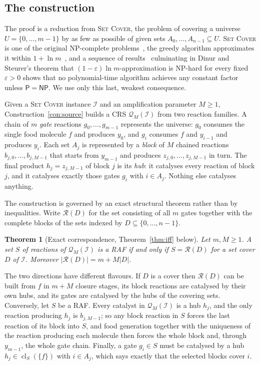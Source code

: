 \documentclass[11pt,a4paper]{article}
\theoremstyle{plain}
\newtheorem{theorem}{Theorem}[section]
\theoremstyle{definition}
\theoremstyle{remark}
\newcommand{\cl}{\operatorname{cl}}
\newcommand{\cQ}{\mathcal{Q}}
\newcommand{\cR}{\mathcal{R}}
\newcommand{\cI}{\mathcal{I}}
\newcommand{\SetCover}{\textup{\textsc{Set Cover}}}
\newcommand{\NP}{\mathsf{NP}}
\newcommand{\Ptime}{\mathsf{P}}
\begin{document}
\subsection*{The construction}

The proof is a reduction from \SetCover, the problem of covering a universe $U=\{0,\dots,m-1\}$ by as few as possible of given sets $A_0,\dots,A_{n-1}\subseteq U$. \SetCover{} is one of the original NP-complete problems~\cite{karp1972reducibility,garey1979computers}, the greedy algorithm approximates it within $1+\ln m$~\cite{johnson1974approximation,lovasz1975ratio,chvatal1979greedy}, and a sequence of results~\cite{lund1994hardness,razsafra1997subconstant,feige1998threshold,alon2006algorithmic,moshkovitz2015projection,dinur2014analytical} culminating in Dinur and Steurer's theorem that $(1-\varepsilon)\ln m$-approximation is NP-hard for every fixed $\varepsilon>0$ shows that no polynomial-time algorithm achieves any constant factor unless $\Ptime=\NP$. We use only this last, weakest consequence.

Given a \SetCover{} instance $\cI$ and an amplification parameter $M\ge 1$, Construction~\ref{con:source} builds a CRS $\cQ_M(\cI)$ from two reaction families. A chain of $m$ \emph{gate} reactions $g_0,\dots,g_{m-1}$ represents the universe: $g_0$ consumes the single food molecule $f$ and produces $y_0$, and $g_i$ consumes $f$ and $y_{i-1}$ and produces $y_i$. Each set $A_j$ is represented by a \emph{block} of $M$ chained reactions $b_{j,0},\dots,b_{j,M-1}$ that starts from $y_{m-1}$ and produces $z_{j,0},\dots,z_{j,M-1}$ in turn. The final product $h_j=z_{j,M-1}$ of block $j$ is its \emph{hub}: it catalyses every reaction of block $j$, and it catalyses exactly those gates $g_i$ with $i\in A_j$. Nothing else catalyses anything.

The construction is governed by an exact structural theorem rather than by inequalities. Write $\cR(D)$ for the set consisting of all $m$ gates together with the complete blocks of the sets indexed by $D\subseteq\{0,\dots,n-1\}$.

\begin{theorem}[Exact correspondence, Theorem~\ref{thm:iff} below]
Let $m,M\ge 1$. A set $S$ of reactions of $\cQ_M(\cI)$ is a RAF if and only if $S=\cR(D)$ for a set cover $D$ of $\cI$. Moreover $|\cR(D)|=m+M|D|$.
\end{theorem}

The two directions have different flavours. If $D$ is a cover then $\cR(D)$ can be built from $f$ in $m+M$ closure stages, its block reactions are catalysed by their own hubs, and its gates are catalysed by the hubs of the covering sets. Conversely, let $S$ be a RAF. Every catalyst in $\cQ_M(\cI)$ is a hub $h_j$, and the only reaction producing $h_j$ is $b_{j,M-1}$; so any block reaction in $S$ forces the last reaction of its block into $S$, and food generation together with the uniqueness of the reaction producing each molecule then forces the whole block and, through $y_{m-1}$, the whole gate chain. Finally, a gate $g_i\in S$ must be catalysed by a hub $h_j\in\cl_S(\{f\})$ with $i\in A_j$, which says exactly that the selected blocks cover $i$.
\end{document}
